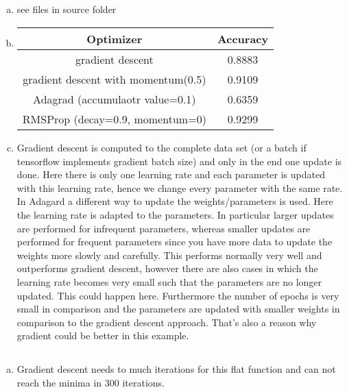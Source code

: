 \documentclass[12pt]{article}
\begin{document}

\setcounter{section}{7}
\setcounter{subsection}{0}

\subsection{ }
\begin{enumerate}[a)]
	\item see files in source folder
	
	\item 
		\begin{tabular}{|c|c|}
			\hline
 		 	Optimizer & Accuracy \\
 		 	\hline
 		 	gradient descent & 0.8883 \\
 		 	\hline
 		 	gradient descent with momentum(0.5) & 0.9109 \\
 		 	\hline
 		 	Adagrad (accumulaotr value=0.1) & 0.6359\\
 		 	\hline
 		 	RMSProp (decay=0.9, momentum=0) & 0.9299 \\
 		 	\hline
 		\end{tabular}
 		
 	\item 
 	Gradient descent is computed to the complete data set (or a batch if tensorflow implements gradient batch size) and only in the end one update is done. Here there is only one learning rate and each parameter is updated with this learning rate, hence we change every parameter with the same rate.\\
 	In Adagard a different way to update the weights/parameters is used. Here the learning rate is adapted to the parameters. In particular larger updates are performed for infrequent parameters, whereas smaller updates are performed for frequent parameters since you have more data to update the weights more slowly and carefully. This performs normally very well and outperforms gradient descent, however there are also cases in which the learning rate becomes very small such that the parameters are no longer updated. This could happen here. Furthermore the number of epochs is very small in comparison and the parameters are updated with smaller weights in comparison to the gradient descent approach. That's also a reason why gradient could be better in this example.\\
\end{enumerate}

\subsection{}
\subsection{}
\begin{enumerate}[a) ]
\item Gradient descent needs to much iterations for this flat function and can not reach the minima in 300 iterations.
\end{enumerate}
\end{document}
